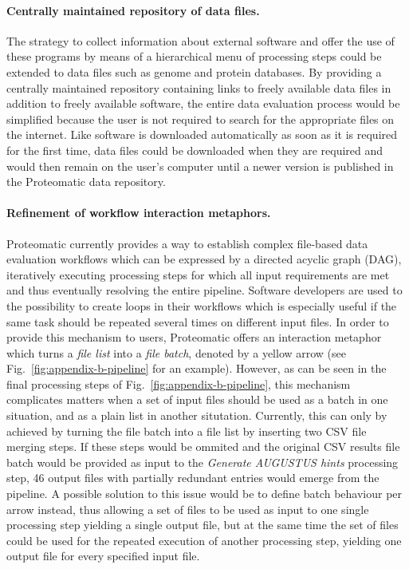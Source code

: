 \paragraph{Centrally maintained repository of data files.}

The strategy to collect information about external software and offer the
use of these programs by means of a hierarchical menu of processing steps
could be extended to data files such as genome and protein databases.
By providing a centrally maintained repository containing links to freely
available data files in addition to freely available software, the entire
data evaluation process would be simplified because the user is not
required to search for the appropriate files on the internet.
Like software is downloaded automatically as soon as it is required for the 
first time, data files could be downloaded when they are required and would
then remain on the user's computer until a newer version is published in
the Proteomatic data repository.

\paragraph{Refinement of workflow interaction metaphors.}

Proteomatic currently provides a way to establish complex file-based data 
evaluation workflows which can be expressed by a directed acyclic graph (DAG),
iteratively executing processing steps for which all input requirements are
met and thus eventually resolving the entire pipeline.
Software developers are used to the possibility to create loops in their
workflows which is especially useful if the same task should be repeated
several times on different input files.
In order to provide this mechanism to users, Proteomatic offers an interaction 
metaphor which turns a {\em file list} into a {\em file batch}, denoted by a 
yellow arrow (see Fig.~\ref{fig:appendix-b-pipeline} for an example).
However, as can be seen in the final processing steps of 
Fig.~\ref{fig:appendix-b-pipeline}, this mechanism complicates matters when
a set of input files should be used as a batch in one situation, and as a
plain list in another situtation.
Currently, this can only by achieved by turning the file batch into a file
list by inserting two CSV file merging steps.
If these steps would be ommited and the original CSV results file batch
would be provided as input to the {\em Generate AUGUSTUS hints} processing
step, 46 output files with partially redundant entries would emerge from
the pipeline.
A possible solution to this issue would be to define batch behaviour per
arrow instead, thus allowing a set of files to be used as input to one single 
processing step yielding a single output file, but at the same time the
set of files could be used for the repeated execution of another processing
step, yielding one output file for every specified input file.

